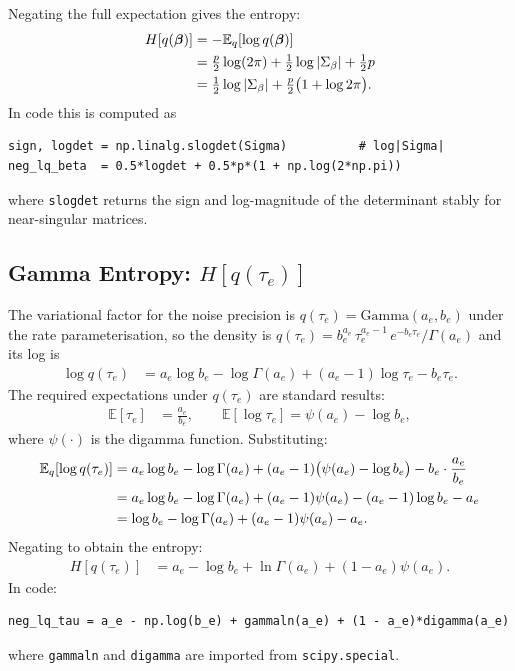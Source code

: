 \documentclass[11pt,a4paper]{article}
\begin{document}
Negating the full expectation gives the entropy:
\begin{align}
  H[q(\bm{\beta})]
    &= -\mathbb{E}_q[\log q(\bm{\beta})] \notag\\
    &= \tfrac{p}{2}\log(2\pi)
       + \tfrac{1}{2}\log|\Sigma_\beta|
       + \tfrac{1}{2}p \notag\\
    &= \tfrac{1}{2}\log|\Sigma_\beta|
       + \tfrac{p}{2}\bigl(1 + \log 2\pi\bigr).
\end{align}
In code this is computed as
\begin{verbatim}
sign, logdet = np.linalg.slogdet(Sigma)          # log|Sigma|
neg_lq_beta  = 0.5*logdet + 0.5*p*(1 + np.log(2*np.pi))
\end{verbatim}
where \texttt{slogdet} returns the sign and log-magnitude of the determinant
stably for near-singular matrices.

\subsection{Gamma Entropy: \texorpdfstring{$H[q(\tau_e)]$}{H[q(tau\_e)]}}

The variational factor for the noise precision is
$q(\tau_e) = \mathrm{Gamma}(a_e, b_e)$ under the rate parameterisation,
so the density is
$q(\tau_e) = b_e^{a_e}\,\tau_e^{a_e-1}\,e^{-b_e\tau_e}/\Gamma(a_e)$
and its log is
\begin{align}
  \log q(\tau_e)
    &= a_e\log b_e - \log\Gamma(a_e)
       + (a_e-1)\log\tau_e - b_e\tau_e.
\end{align}
The required expectations under $q(\tau_e)$ are standard results:
\begin{align}
  \mathbb{E}[\tau_e]      &= \frac{a_e}{b_e}, \qquad
  \mathbb{E}[\log\tau_e] = \psi(a_e) - \log b_e,
\end{align}
where $\psi(\cdot)$ is the digamma function.
Substituting:
\begin{align}
  \mathbb{E}_q[\log q(\tau_e)]
    &= a_e\log b_e - \log\Gamma(a_e)
       + (a_e-1)\bigl(\psi(a_e)-\log b_e\bigr)
       - b_e\cdot\frac{a_e}{b_e} \notag\\
    &= a_e\log b_e - \log\Gamma(a_e)
       + (a_e-1)\psi(a_e) - (a_e-1)\log b_e
       - a_e \notag\\
    &= \log b_e - \log\Gamma(a_e)
       + (a_e-1)\psi(a_e) - a_e.
\end{align}
Negating to obtain the entropy:
\begin{align}
  H[q(\tau_e)]
    &= a_e - \log b_e + \ln\Gamma(a_e) + (1-a_e)\psi(a_e).
\end{align}
In code:
\begin{verbatim}
neg_lq_tau = a_e - np.log(b_e) + gammaln(a_e) + (1 - a_e)*digamma(a_e)
\end{verbatim}
where \texttt{gammaln} and \texttt{digamma} are imported from \texttt{scipy.special}.
\end{document}
